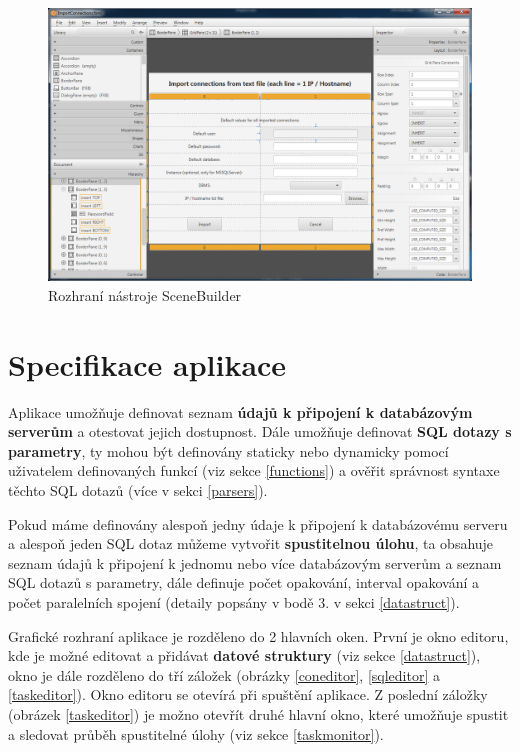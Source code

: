 \documentclass[czech,bachelor,public,dept460,male,cpdeclaration,twoside]{diploma}
\begin{document}
\begin{figure}[!h]\centering\includegraphics[width=1.0\textwidth]{Figures/SceneBuilder.png}\caption{Rozhraní nástroje SceneBuilder}
\end{figure}

\section{Specifikace aplikace}
Aplikace umožňuje definovat seznam \textbf{údajů k připojení k databázovým serverům} a otestovat jejich dostupnost. Dále umožňuje definovat \textbf{SQL dotazy s parametry}, ty mohou být definovány staticky nebo dynamicky pomocí uživatelem definovaných funkcí (viz sekce \ref{functions}) a ověřit správnost syntaxe těchto SQL dotazů (více v sekci \ref{parsers}).

Pokud máme definovány alespoň jedny údaje k připojení k databázovému serveru a alespoň jeden SQL dotaz můžeme vytvořit \textbf{spustitelnou úlohu}, ta obsahuje seznam údajů k připojení k jednomu nebo více databázovým serverům a seznam SQL dotazů s parametry, dále definuje počet opakování, interval opakování a počet paralelních spojení (detaily popsány v bodě 3. v sekci \ref{datastruct}). 

Grafické rozhraní aplikace je rozděleno do 2 hlavních oken. První je okno editoru, kde je možné editovat a přidávat \textbf{datové struktury} (viz sekce \ref{datastruct}), okno je dále rozděleno do tří záložek (obrázky \ref{coneditor}, \ref{sqleditor} a \ref{taskeditor}). Okno editoru se otevírá při spuštění aplikace. Z poslední záložky (obrázek \ref{taskeditor}) je možno otevřít druhé hlavní okno, které umožňuje spustit a sledovat průběh spustitelné úlohy (viz sekce \ref{taskmonitor}).
\end{document}
